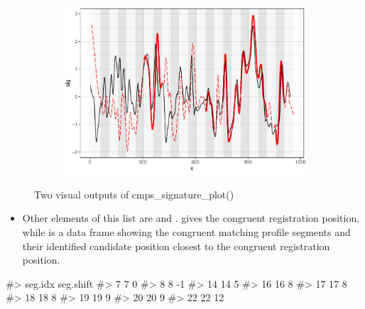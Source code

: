 \begin{figure}[hbt]
\begin{subfigure}[t]{\textwidth}
\begin{adjustbox}{valign=t}
\begin{minipage}{.39\textwidth}
{\small {}
\begin{Schunk}
\end{Schunk}
}
\vspace{1em}
\end{minipage}
\begin{minipage}{.59\textwidth}
\includegraphics[width=\textwidth]{ju-hofmann_files/figure-latex/sigplot2-1.pdf}
\end{minipage}
\end{adjustbox}
\end{subfigure}
\caption{\label{fig:sigplots} Two visual outputs of cmps\_signature\_plot()}
\end{figure}

\begin{itemize}
\tightlist
\item
  Other elements of this list are  and
  .  gives the congruent registration
  position, while  is a data frame showing the
  congruent matching profile segments and their identified candidate
  position closest to the congruent registration position.
\end{itemize}

\begin{Schunk}
\begin{Soutput}
#>    seg.idx seg.shift
#> 7        7         0
#> 8        8        -1
#> 14      14         5
#> 16      16         8
#> 17      17         8
#> 18      18         8
#> 19      19         9
#> 20      20         9
#> 22      22        12
\end{Soutput}
\end{Schunk}

